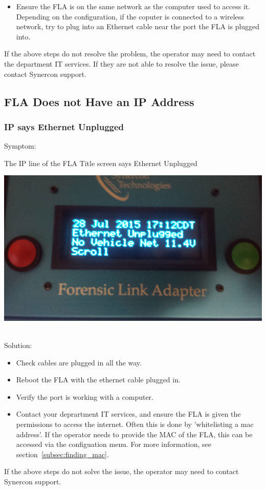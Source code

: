 \documentclass[11pt]{article}
\begin{document}
\begin{itemize}
\item Ensure the FLA is on the same network as the computer used to access it. Depending on the configuration, if the coputer is connected to a wireless network, try to plug into an Ethernet cable near the port the FLA is plugged into.
\end{itemize}
If the above steps do not resolve the problem, the operator may need to contact the department IT services. If they are not able to resolve the issue, please contact Synercon support.

\subsection{FLA Does not Have an IP Address}
\subsubsection{IP says Ethernet Unplugged}
Symptom:\\
\noindent\begin{minipage}{0.45\textwidth}%
The IP line of the FLA Title screen says Ethernet Unplugged
\end{minipage}%
\hfill%
\begin{minipage}{0.45\textwidth}
\includegraphics[width=\linewidth]{./fla_screens/title_screen_eth_unplug}
\end{minipage}\\
Solution:\\
\begin{itemize}
\item Check cables are plugged in all the way.
\item Reboot the FLA with the ethernet cable plugged in.
\item Verify the port is working with a computer.
\item Contact your deprartment IT services, and ensure the FLA is given the permissions to access the internet. Often this is done by 'whitelisting a mac address'. If the operator needs to provide the MAC of the FLA, this can be accessed via the configuation menu. For more information, see section~\ref{subsec:finding_mac}.
\end{itemize}
If the above steps do not solve the issue, the operator may need to contact Synercon support.
\end{document}
